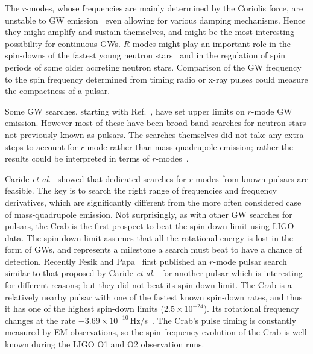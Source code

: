 \documentclass{ttuthes2007}
\begin{document}
The $r$-modes, whose frequencies are mainly determined by the Coriolis force,
are unstable to \ac{GW} emission~\cite{Andersson_1998,Friedman_1998} even
allowing for various damping mechanisms. Hence they might amplify and sustain
themselves, and might be the most interesting possibility for continuous
\acp{GW}. $R$-modes might play an important role in the spin-downs of the
fastest young neutron stars~\cite{Owen_1998} and in the regulation of spin
periods of some older accreting neutron stars. Comparison of the \ac{GW}
frequency to the spin frequency determined from timing radio or x-ray pulses
could measure the compactness of a pulsar.

Some \ac{GW} searches, starting with Ref.~\cite{Abadie_2010}, have set upper
limits on $r$-mode \ac{GW} emission. However most of these have been broad band
searches for neutron stars not previously known as pulsars. The searches
themselves did not take any extra steps to account for $r$-mode rather than
mass-quadrupole emission; rather the results could be interpreted in terms of
$r$-modes~\cite{Owen_2010}.

Caride \textit{et al.}~\cite{PhysRevD.100.064013} showed that dedicated searches for
$r$-modes from known pulsars are feasible. The key is to search the right range
of frequencies and frequency derivatives, which are significantly different from
the more often considered case of mass-quadrupole emission. Not surprisingly,
as with other \ac{GW} searches for pulsars, the Crab is the first prospect to
beat the spin-down limit using \ac{LIGO} data. The spin-down limit assumes that
all the rotational energy is lost in the form of \acp{GW}, and represents a
milestone a search must beat to have a chance of detection. Recently Fesik and
Papa~\cite{Fesik2020} first published an $r$-mode pulsar search similar to that
proposed by Caride \textit{et al.}~\cite{PhysRevD.100.064013} for another pulsar which
is interesting for different reasons; but they did not beat its spin-down limit.
The Crab is a relatively nearby pulsar with one of the fastest known spin-down
rates, and thus it has one of the highest spin-down limits
($2.5\times10^{-24}$). Its rotational frequency changes at the rate
$-3.69\times10^{-10}$\,Hz/s~\cite{JodrellBankObservatory}. The Crab's pulse
timing is constantly measured by \ac{EM} observations, so the spin frequency
evolution of the Crab is well known during the LIGO \ac{O1} and \ac{O2}
observation runs.
\end{document}
